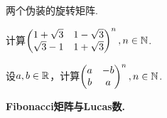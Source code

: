 \begin{problem}
  {\kaishu 两个伪装的旋转矩阵.}
  \begin{enum}
    \item 计算$\begin{pmatrix}
      1 + \sqrt3 & 1 - \sqrt3 \\
      \sqrt3 -1  & 1 + \sqrt3
    \end{pmatrix}^n,n\in\mathbb N$.
    \item 设$a,b\in\mathbb R$，计算$\begin{pmatrix}
      a & -b \\
      b & a
    \end{pmatrix}^n,n\in\mathbb N$.
  \end{enum}
\end{problem}

\begin{mybox}
  \begin{problem}{\bfseries Fibonacci矩阵与Lucas数.}


\end{problem}
\end{mybox}
